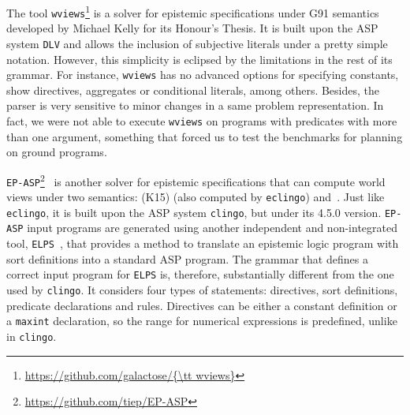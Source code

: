 \documentclass{new_tlp}
\def\eclingo{{\tt eclingo}}
\def\wviews{{\tt \wviews}}
\def\clingo{{\tt clingo}}
\def\wviews{{\tt wviews}}
\def\EPASP{{\tt EP-ASP}}
\begin{document}
The tool \wviews\footnote{\url{https://github.com/galactose/\wviews}} is a solver for epistemic specifications under G91 semantics developed by Michael Kelly for its Honour's Thesis. It is built upon the ASP system {\tt DLV} and allows the inclusion of subjective literals under a pretty simple notation. However, this simplicity is eclipsed by the limitations in the rest of its grammar. For instance, \wviews{} has no advanced options for specifying constants, show directives, aggregates or conditional literals, among others. Besides, the parser is very sensitive to minor changes in a same problem representation. In fact, we were not able to execute \wviews{} on programs with predicates with more than one argument, something that forced us to test the benchmarks for planning on ground programs.

\EPASP\footnote{\url{https://github.com/tiep/EP-ASP}}~\cite{SLKL17} is another solver for epistemic specifications that can compute world views under two semantics: \cite{kawabagezh15} (K15)  (also computed by \eclingo{}) and~\cite{sheeit17a}. Just like \eclingo{}, it is built upon the ASP system \clingo, but under its 4.5.0 version. \EPASP{} input programs are generated using another independent and non-integrated tool, {\tt ELPS}~\cite{BK14}, that provides a method to translate an epistemic logic program with sort definitions into a standard ASP program. The grammar that defines a correct input program for {\tt ELPS} is, therefore, substantially different from the one used by \clingo{}. It considers four types of statements: directives, sort definitions, predicate declarations and rules. Directives can be either a constant definition or a {\tt maxint} declaration, so the range for numerical expressions is predefined, unlike in \clingo{}.

\end{document}
